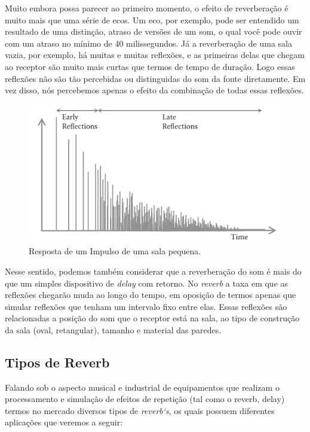 		Muito embora possa parecer ao primeiro momento, o efeito de reverberação é muito mais que uma série de ecos. Um eco, por exemplo, pode ser entendido um resultado de uma distinção, atraso de versões de um som, o qual você pode ouvir com um atraso no mínimo de 40 milissegundos. Já a reverberação de uma sala vazia, por exemplo, há muitas e muitas reflexões, e as primeiras delas que chegam ao receptor são muito mais curtas que termos de tempo de duração. Logo essas reflexões não são tão percebidas ou distinguidas do som da fonte diretamente. Em vez disso, nós percebemos apenas o efeito da combinação de todas essas reflexões.
		
		\begin{figure}[!ht]
			\centering
			\includegraphics[scale=0.5]{./figuras/reverb02.png}
			\caption{Resposta de um Impulso de uma sala pequena.}
			\label{reverb02}
		\end{figure}
		
		Nesse sentido, podemos também considerar que a reverberação do som é mais do que um simples dispositivo de \textit{delay} com retorno. No \textit{reverb} a taxa em que as reflexões chegarão muda ao longo do tempo, em oposição de termos apenas que simular reflexões que tenham um intervalo fixo entre elas. Essas reflexões são relacionadas a posição do som que o receptor está na sala, ao tipo de construção da sala (oval, retangular), tamanho e material das paredes. 
		
		
	\subsection{Tipos de Reverb}
	
		Falando sob o aspecto musical e industrial de equipamentos que realizam o processamento e simulação de efeitos de repetição (tal como o reverb, delay) termos no mercado diversos tipos de \textit{reverb`s}, os quais possuem diferentes aplicações que veremos a seguir:
		
